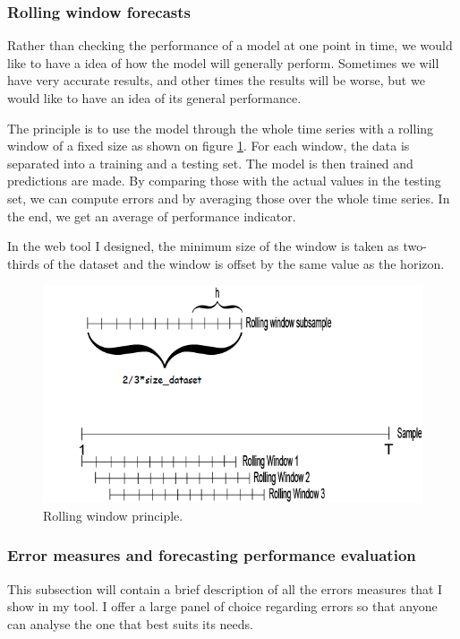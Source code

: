 \documentclass[11pt,a4paper,oneside]{book}
\begin{document}
\subsubsection{Rolling window forecasts}\label{rwindow}


Rather than checking the performance of a model at one point in time, we would like to have a idea of how the model will generally perform. Sometimes we will have very accurate results, and other times the results will be worse, but we would like to have an idea of its general performance.

The principle is to use the model through the whole time series with a rolling window of a fixed size as shown on figure \ref{fig:rolling}. For each window, the data is separated into a training and a testing set. The model is then trained and predictions are made. By comparing those with the actual values in the testing set, we can compute errors and by averaging those over the whole time series. In the end, we get an average of performance indicator.

In the web tool I designed, the minimum size of the window is taken as two-thirds of the dataset and the window is offset by the same value as the horizon.


\begin{figure}[!h]
  \centering
    \includegraphics[scale=0.7]{img/rollingwindow.png}
  \caption{Rolling window principle\cite{rolling}.}
  \label{fig:rolling}
\end{figure}


\subsubsection{Error measures and forecasting performance evaluation}\label{errors}

This subsection will contain a brief description of all the errors measures that I show in my tool. I offer a large panel of choice regarding errors so that anyone can analyse the one that best suits its needs. 
\end{document}
